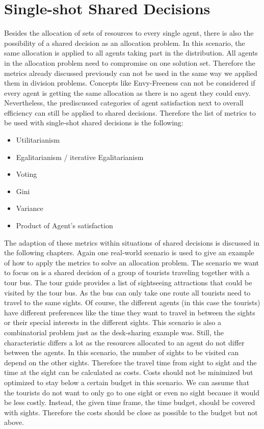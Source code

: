 \documentclass[german, a4paper, 11pt, oneside]{scrbook}
\begin{document}
\section{Single-shot Shared Decisions}
Besides the allocation of sets of resources to every single agent, there is also the possibility of a shared decision as an allocation problem. In this scenario, the same allocation is applied to all agents taking part in the distribution. All agents in the allocation problem need to compromise on one solution set. Therefore the metrics already discussed previously can not be used in the same way we applied them in division problems. Concepts like Envy-Freeness can not be considered if every agent is getting the same allocation as there is no agent they could envy. Nevertheless, the prediscussed categories of agent satisfaction next to overall efficiency can still be applied to shared decisions. Therefore the list of metrics to be used with single-shot shared decisions is the following:
\begin{itemize}
  \item Utilitarianism
  \item Egalitarianism / iterative Egalitarianism
  \item Voting
\item Gini
\item Variance
\item Product of Agent's satisfaction
\end{itemize}
The adaption of these metrics within situations of shared decisions is discussed in the following chapters. Again one real-world scenario is used to give an example of how to apply the metrics to solve an allocation problem. The scenario we want to focus on is a shared decision of a group of tourists traveling together with a tour bus. The tour guide provides a list of sightseeing attractions that could be visited by the tour bus. As the bus can only take one route all tourists need to travel to the same sights. Of course, the different agents (in this case the tourists) have different preferences like the time they want to travel in between the sights or their special interests in the different sights. This scenario is also a combinatorial problem just as the desk-sharing example was. Still, the characteristic differs a lot as the resources allocated to an agent do not differ between the agents. In this scenario, the number of sights to be visited can depend on the other sights. Therefore the travel time from sight to sight and the time at the sight can be calculated as costs. Costs should not be minimized but optimized to stay below a certain budget in this scenario. We can assume that the tourists do not want to only go to one sight or even no sight because it would be less costly. Instead, the given time frame, the time budget, should be covered with sights. Therefore the costs should be close as possible to the budget but not above.
\end{document}
